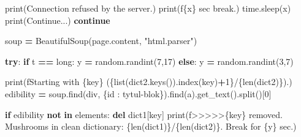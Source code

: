 \documentclass[
]{article}
\newenvironment{Shaded}{\begin{snugshade}}{\end{snugshade}}
\newcommand{\BuiltInTok}[1]{#1}
\newcommand{\ControlFlowTok}[1]{\textcolor[rgb]{0.13,0.29,0.53}{\textbf{#1}}}
\newcommand{\DecValTok}[1]{\textcolor[rgb]{0.00,0.00,0.81}{#1}}
\newcommand{\KeywordTok}[1]{\textcolor[rgb]{0.13,0.29,0.53}{\textbf{#1}}}
\newcommand{\NormalTok}[1]{#1}
\newcommand{\OperatorTok}[1]{\textcolor[rgb]{0.81,0.36,0.00}{\textbf{#1}}}
\newcommand{\SpecialCharTok}[1]{\textcolor[rgb]{0.00,0.00,0.00}{#1}}
\newcommand{\SpecialStringTok}[1]{\textcolor[rgb]{0.31,0.60,0.02}{#1}}
\newcommand{\StringTok}[1]{\textcolor[rgb]{0.31,0.60,0.02}{#1}}
\begin{document}
\begin{Shaded}
\begin{Highlighting}[]
                        \BuiltInTok{print}\NormalTok{(}\StringTok{\textquotesingle{}Connection refused by the server.\textquotesingle{}}\NormalTok{)}
                        \BuiltInTok{print}\NormalTok{(}\SpecialStringTok{f\textquotesingle{}}\SpecialCharTok{\{}\NormalTok{x}\SpecialCharTok{\}}\SpecialStringTok{ sec break.\textquotesingle{}}\NormalTok{)}
\NormalTok{                        time.sleep(x)}
                        \BuiltInTok{print}\NormalTok{(}\StringTok{\textquotesingle{}Continue...\textquotesingle{}}\NormalTok{)}
                        \ControlFlowTok{continue}

\NormalTok{                soup }\OperatorTok{=}\NormalTok{ BeautifulSoup(page.content, }\StringTok{"html.parser"}\NormalTok{)}

                \ControlFlowTok{try}\NormalTok{:}
                    \ControlFlowTok{if}\NormalTok{ t }\OperatorTok{==} \StringTok{\textquotesingle{}long\textquotesingle{}}\NormalTok{:}
\NormalTok{                        y }\OperatorTok{=}\NormalTok{ random.randint(}\DecValTok{7}\NormalTok{,}\DecValTok{17}\NormalTok{)}
                    \ControlFlowTok{else}\NormalTok{:}
\NormalTok{                        y }\OperatorTok{=}\NormalTok{ random.randint(}\DecValTok{3}\NormalTok{,}\DecValTok{7}\NormalTok{)}

                    \BuiltInTok{print}\NormalTok{(}\SpecialStringTok{f\textquotesingle{}Starting with }\SpecialCharTok{\{}\NormalTok{key}\SpecialCharTok{\}}\SpecialStringTok{ (}\SpecialCharTok{\{}\BuiltInTok{list}\NormalTok{(dict2.keys())}\SpecialCharTok{.}\NormalTok{index(key)}\OperatorTok{+}\DecValTok{1}\SpecialCharTok{\}}\SpecialStringTok{/}\SpecialCharTok{\{}\BuiltInTok{len}\NormalTok{(dict2)}\SpecialCharTok{\}}\SpecialStringTok{).\textquotesingle{}}\NormalTok{)}
\NormalTok{                    edibility }\OperatorTok{=}\NormalTok{ soup.find(}\StringTok{\textquotesingle{}div\textquotesingle{}}\NormalTok{, \{}\StringTok{\textquotesingle{}id\textquotesingle{}}\NormalTok{ : }\StringTok{\textquotesingle{}tytul{-}blok\textquotesingle{}}\NormalTok{\}).find(}\StringTok{\textquotesingle{}a\textquotesingle{}}\NormalTok{).get\_text().split()[}\DecValTok{0}\NormalTok{]}

                    \ControlFlowTok{if}\NormalTok{ edibility }\KeywordTok{not} \KeywordTok{in}\NormalTok{ elements:}
                        \KeywordTok{del}\NormalTok{ dict1[key]}
                        \BuiltInTok{print}\NormalTok{(}\SpecialStringTok{f\textquotesingle{}\textgreater{}\textgreater{}\textgreater{}\textgreater{}\textgreater{}}\SpecialCharTok{\{}\NormalTok{key}\SpecialCharTok{\}}\SpecialStringTok{ removed. Mushrooms in clean dictionary: }\SpecialCharTok{\{}\BuiltInTok{len}\NormalTok{(dict1)}\SpecialCharTok{\}}\SpecialStringTok{/}\SpecialCharTok{\{}\BuiltInTok{len}\NormalTok{(dict2)}\SpecialCharTok{\}}\SpecialStringTok{. Break for }\SpecialCharTok{\{}\NormalTok{y}\SpecialCharTok{\}}\SpecialStringTok{ sec.\textquotesingle{}}\NormalTok{)}


\end{Highlighting}
\end{Shaded}
\end{document}

